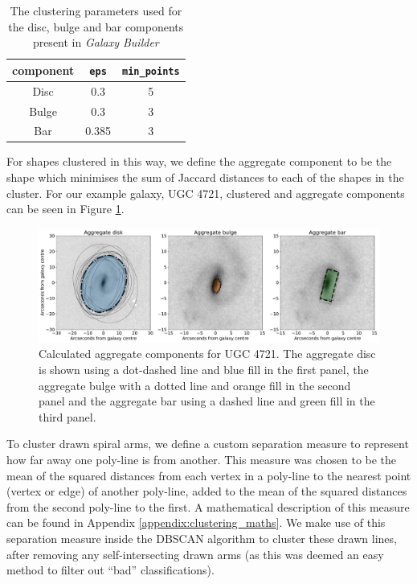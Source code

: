 \documentclass[../main.tex]{subfiles}
\begin{document}
\begin{table}
  \centering
  \caption{The clustering parameters used for the disc, bulge and bar components present in \textit{Galaxy Builder}}
  \begin{tabular}{ |c|c|c| }
    \hline
    component & \texttt{eps} & \texttt{min\_points} \\
    \hline
    Disc & 0.3 & 5 \\
    Bulge & 0.3 & 3 \\
    Bar & 0.385 & 3 \\
    \hline
  \end{tabular}
  \label{table:dbscan_params}
\end{table}

For shapes clustered in this way, we define the aggregate component to be the shape which minimises the sum of Jaccard distances to each of the shapes in the cluster. For our example galaxy, UGC 4721, clustered and aggregate components can be seen in Figure \ref{fig:mean_shapes}.

\begin{figure}
  \includegraphics[width=17.3cm]{images__method/mean_shapes.pdf}
  \caption{Calculated aggregate components for UGC 4721. The aggregate disc is shown using a dot-dashed line and blue fill in the first panel, the aggregate bulge with a dotted line and orange fill in the second panel and the aggregate bar using a dashed line and green fill in the third panel.}
  \label{fig:mean_shapes}
\end{figure}

To cluster drawn spiral arms, we define a custom separation measure to represent how far away one poly-line is from another. This measure was chosen to be the mean of the squared distances from each vertex in a poly-line to the nearest point (vertex or edge) of another poly-line, added to the mean of the squared distances from the second poly-line to the first. A mathematical description of this measure can be found in Appendix \ref{appendix:clustering_maths}. We make use of this separation measure inside the DBSCAN algorithm to cluster these drawn lines, after removing any self-intersecting drawn arms (as this was deemed an easy method to filter out ``bad'' classifications).
\end{document}
